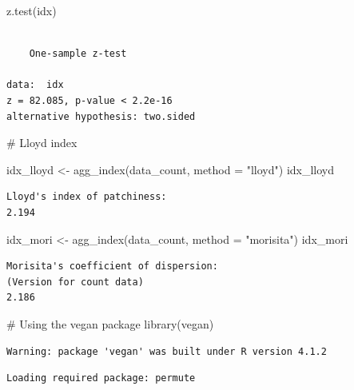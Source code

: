 \documentclass[
  letterpaper,
  DIV=11,
  numbers=noendperiod]{scrreprt}
\newenvironment{Shaded}{\begin{snugshade}}{\end{snugshade}}
\newcommand{\AttributeTok}[1]{\textcolor[rgb]{0.40,0.45,0.13}{#1}}
\newcommand{\CommentTok}[1]{\textcolor[rgb]{0.37,0.37,0.37}{#1}}
\newcommand{\FunctionTok}[1]{\textcolor[rgb]{0.28,0.35,0.67}{#1}}
\newcommand{\NormalTok}[1]{\textcolor[rgb]{0.00,0.23,0.31}{#1}}
\newcommand{\OtherTok}[1]{\textcolor[rgb]{0.00,0.23,0.31}{#1}}
\newcommand{\StringTok}[1]{\textcolor[rgb]{0.13,0.47,0.30}{#1}}
\begin{document}
\begin{Shaded}
\begin{Highlighting}[]
\FunctionTok{z.test}\NormalTok{(idx)}
\end{Highlighting}
\end{Shaded}

\begin{verbatim}

    One-sample z-test

data:  idx
z = 82.085, p-value < 2.2e-16
alternative hypothesis: two.sided
\end{verbatim}

\begin{Shaded}
\begin{Highlighting}[]
\CommentTok{\# Lloyd index}

\NormalTok{idx\_lloyd }\OtherTok{\textless{}{-}} \FunctionTok{agg\_index}\NormalTok{(data\_count, }\AttributeTok{method =} \StringTok{"lloyd"}\NormalTok{)}
\NormalTok{idx\_lloyd}
\end{Highlighting}
\end{Shaded}

\begin{verbatim}
Lloyd's index of patchiness:
2.194
\end{verbatim}

\begin{Shaded}
\begin{Highlighting}[]
\NormalTok{idx\_mori }\OtherTok{\textless{}{-}} \FunctionTok{agg\_index}\NormalTok{(data\_count, }\AttributeTok{method =} \StringTok{"morisita"}\NormalTok{)}
\NormalTok{idx\_mori}
\end{Highlighting}
\end{Shaded}

\begin{verbatim}
Morisita's coefficient of dispersion:
(Version for count data)
2.186
\end{verbatim}

\begin{Shaded}
\begin{Highlighting}[]
\CommentTok{\# Using the vegan package}
\FunctionTok{library}\NormalTok{(vegan)}
\end{Highlighting}
\end{Shaded}

\begin{verbatim}
Warning: package 'vegan' was built under R version 4.1.2
\end{verbatim}

\begin{verbatim}
Loading required package: permute
\end{verbatim}
\end{document}
